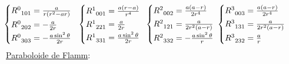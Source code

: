\begin{align*}
\hspace{-15pt}
&\begin{cases} 
R^0_{\;\;101}=\frac{a}{r(r^2-ar)}
\vspace{2pt}
\\
R^0_{\;\;202}= -\frac{a}{2r}
\vspace{2pt}
\\
R^0_{\;\;303}= -\frac{a\sin^2 \theta}{2r}
\end{cases}
\hspace{-12pt}
&\begin{cases}
R^1_{\; \; 001}= \frac{a(r-a)}{r^4}
\vspace{2pt}
\\
R^1_{\;\;221}=\frac{a}{2r}
\vspace{2pt}
\\
R^1_{\;\;331}= \frac{a\sin^2 \theta}{2r}
\end{cases}
\hspace{-5pt}
&\begin{cases} 
R^2_{\; \; 002}= \frac{a(a-r)}{2r^4}
\vspace{2pt}
\\
R^2_{\;\;121}=\frac{a}{2r^2(a-r)}
\vspace{2pt}
\\
R^2_{\;\;332}=- \frac{a\sin^2 \theta}{r}
\end{cases}
\hspace{-16pt}
&\begin{cases} 
R^3_{\; \; 003}= \frac{a(a-r)}{2r^4}
\vspace{2pt}
\\
R^3_{\;\;131}=\frac{a}{2r^2(a-r)}
\vspace{2pt}
\\
R^3_{\;\;232}= \frac{a}{r}
\end{cases}
\end{align*}
\underline{Paraboloide de Flamm}:\\
\begin{minipage}[c]{0.7\linewidth}
\hspace*{10pt}\vspace*{2pt}
\\
\hspace*{10pt}\vspace*{2pt}
\\
\hspace*{10pt}\vspace*{2pt}
\\
\hspace*{10pt}\vspace*{2pt}
\end{minipage}%
